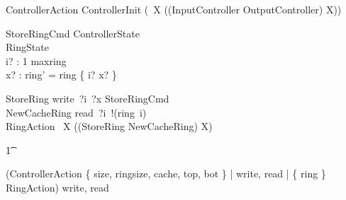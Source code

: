 \documentclass{article}
\begin{document}



\begin{circusaction}
    ControllerAction \circdef ControllerInit \circseq (\circmu\ X \circspot ((InputController \extchoice OutputController) \circseq X)) \\
\end{circusaction}


\begin{schema}{StoreRingCmd}
    \Xi ControllerState
    \\%
    \Delta RingState
    \\%
    i? : 1 \upto maxring
    \\%
    x? : \nat
\where
    ring' = ring \oplus \{ i? \mapsto x? \}
\end{schema}

\begin{circusaction}
   StoreRing \circdef write~?i~?x \then StoreRingCmd \\
   NewCacheRing \circdef read~?i~!(ring~i) \then \Skip \\
   RingAction \circdef \circmu\ X \circspot ((StoreRing \extchoice NewCacheRing) \circseq X)
\end{circusaction}

\begin{circusaction}
    \t1 \circspot

   (ControllerAction \lpar
        \{ size, ringsize, cache, top, bot \} |
        \lchanset write, read \rchanset |
        \{ ring \} \rpar
    RingAction) \circhide \lchanset write, read \rchanset
\end{circusaction}

\begin{circus}
    \circend
\end{circus}

\CircusDeclSummary
\end{document}
